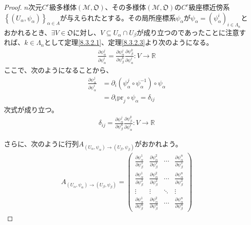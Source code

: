 \documentclass[dvipdfmx]{jsarticle}
\begin{document}
\begin{proof}
$n$次元$C^{r}$級多様体$\left( \mathcal{M},\mathfrak{O} \right)$、その多様体$\left( \mathcal{M},\mathfrak{O} \right)$の$C^{r}$級座標近傍系$\left\{ \left( U_{\alpha},\psi_{\alpha} \right) \right\}_{\alpha \in A}$が与えられたとする。その局所座標系$\psi_\alpha $が$\psi_\alpha =\left( \psi_\alpha^i \right)_{i\in \varLambda_n }$とおかれるとき、$\exists V\in \mathfrak{O}$に対し、$V\subseteq U_\alpha \cap U_\beta $が成り立つのであったことに注意すれば、$k\in \varLambda_n $として定理\ref{8.3.2.1}、定理\ref{8.3.2.3}より次のようになる。
\begin{align*}
  \frac{\partial \psi_\alpha^j }{\partial \psi_\alpha^i } = \frac{\partial \psi_\alpha^j }{\partial \psi_\beta^k } \frac{\partial \psi_\beta^k }{\partial \psi_\alpha^i } : V\rightarrow \mathbb{R}
\end{align*}
ここで、次のようになることから、
\begin{align*}
  \frac{\partial \psi_\alpha^j }{\partial \psi_\alpha^i } &= \partial_i \left( \psi_\alpha^j \circ \psi_\alpha^{-1} \right) \circ \psi_\alpha \\
  &= \partial_i \mathrm{pr}_j \circ \psi_\alpha = \delta_{ij} 
\end{align*}
次式が成り立つ。
\begin{align*}
  \delta_{ij} = \frac{\partial \psi_\alpha^j }{\partial \psi_\beta^k } \frac{\partial \psi_\beta^k }{\partial \psi_\alpha^i } : V\rightarrow \mathbb{R}
\end{align*}\par
さらに、次のように行列$A_{\left(U_\alpha ,\psi_\alpha \right)\rightarrow \left(U_\beta ,\psi_\beta \right)}$がおかれよう。
\begin{align*}
  A_{\left(U_\alpha ,\psi_\alpha \right)\rightarrow \left(U_\beta ,\psi_\beta \right)} = \begin{pmatrix}
    \frac{\partial \psi_\alpha^1 }{\partial \psi_\beta^1 } & \frac{\partial \psi_\alpha^2 }{\partial \psi_\beta^1 } & \cdots & \frac{\partial \psi_\alpha^n }{\partial \psi_\beta^1 } \\
    \frac{\partial \psi_\alpha^1 }{\partial \psi_\beta^2 } & \frac{\partial \psi_\alpha^2 }{\partial \psi_\beta^2 } & \cdots & \frac{\partial \psi_\alpha^n }{\partial \psi_\beta^2 } \\
    \vdots & \vdots & \ddots & \vdots \\
    \frac{\partial \psi_\alpha^1 }{\partial \psi_\beta^n } & \frac{\partial \psi_\alpha^2 }{\partial \psi_\beta^n } & \cdots & \frac{\partial \psi_\alpha^n }{\partial \psi_\beta^n } 

\end{pmatrix}
\end{align*}
\end{proof}
\end{document}
